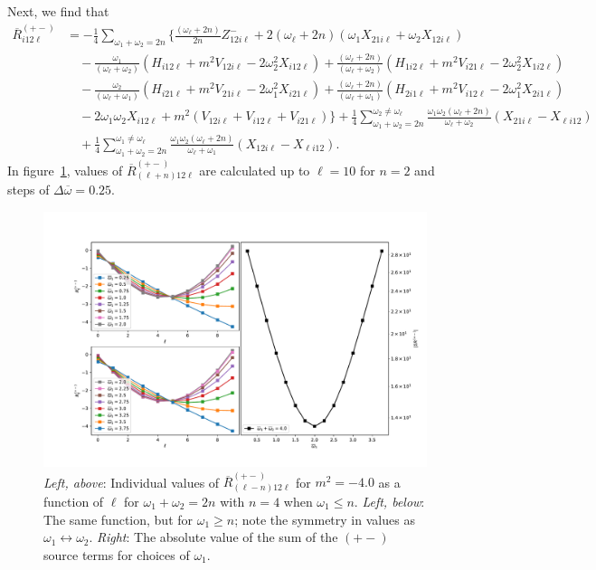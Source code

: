\documentclass[letterpaper,11pt]{article}
\newcommand{\ol}{\omega_\ell}
\newcommand{\oone}{\omega_1}
\newcommand{\otwo}{\omega_2}
\begin{document}
Next, we find that
\begin{align}
\label{R2}
\overline{R}_{i12\ell}^{(+-)} &= - \frac{1}{4} \sum_{\oone + \otwo = 2n} \Big\{ \frac{(\ol + 2n)}{2n} Z^-_{12i\ell} + 2 (\ol + 2n) \left( \oone X_{21i\ell} + \otwo X_{12i\ell} \right) \nonumber \\
%
& \quad  -\frac{\oone}{(\ol + \otwo)} \left( H_{i12\ell} + m^2 V_{12i\ell} - 2 \otwo^2 X_{i12\ell} \right) + \frac{(\ol + 2n)}{(\ol + \otwo)} \left( H_{1i2\ell} + m^2 V_{i21\ell} - 2\otwo^2 X_{1i2\ell} \right)  \nonumber \\
%
& \quad - \frac{\otwo}{(\ol + \oone)} \left( H_{i21\ell} + m^2 V_{21i\ell} - 2\oone^2 X_{i21\ell} \right) + \frac{(\ol + 2n)}{(\ol + \oone)} \left(H_{2i1\ell} + m^2 V_{i12\ell} - 2\oone^2 X_{2i1\ell} \right)  \nonumber \\
%
& \quad  - 2 \oone\otwo X_{i12\ell} + m^2 \left( V_{12i\ell} + V_{i12\ell} + V_{i21\ell} \right) \Big\} + \frac{1}{4} \sum^{\otwo \neq \ol}_{\oone + \otwo = 2n} \frac{\oone\otwo(\ol + 2n)}{\ol + \otwo} \left( X_{21i\ell} - X_{\ell i 12} \right) \nonumber \\
%
& \quad + \frac{1}{4} \sum^{\oone \neq \ol}_{\oone + \otwo = 2n} \frac{\oone\otwo(\ol + 2n)}{\ol + \oone} \left( X_{12i\ell} - X_{\ell i 12} \right).
\end{align}
In figure~\ref{fig:atoi_pm_m-4_0}, values of $\overline{R}^{(+-)}_{(\ell + n) 1 2 \ell}$ are calculated up to $\ell= 10$ for $n = 2$ and steps of $\Delta \overline{\omega} = 0.25$.

\begin{figure}
\centering
	\includegraphics[width=\textwidth]{./figures/NN_equalfreq_pmchannel_n2_m-4_0}
	\caption{{\it Left, above}: Individual values of $\overline{R}^{(+-)}_{(\ell - n)12\ell}$ for $m^2 = -4.0$ as a function of $\ell$ for $\oone + \otwo = 2n$ with $n = 4$ when $\oone \leq n$. {\it Left, below}: The same function, but for $\oone \geq n$; note the symmetry in values as $\oone \leftrightarrow \otwo$. {\it Right}: The absolute value of the sum of the $(+-)$ source terms for choices of $\oone$.}
	\label{fig:atoi_pm_m-4_0}
\end{figure}
\end{document}
